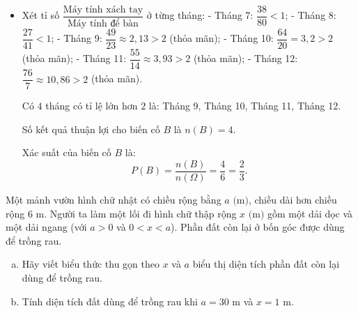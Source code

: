 \begin{bt}
{\begin{enumerate}[a)]
\begin{itemize}
				Số kết quả thuận lợi cho biến cố $A$ là $n(A) = 4$.
				
				Xác suất của biến cố $A$ là:
				$$P(A) = \dfrac{n(A)}{n(\Omega)} = \dfrac{4}{6} = \dfrac{2}{3}.$$
				\item Xét tỉ số $\dfrac{\text{Máy tính xách tay}}{\text{Máy tính để bàn}}$ ở từng tháng:
				- Tháng 7: $\dfrac{38}{80} < 1$;
				- Tháng 8: $\dfrac{27}{41} < 1$;
				- Tháng 9: $\dfrac{49}{23} \approx 2{,}13 > 2$ (thỏa mãn);
				- Tháng 10: $\dfrac{64}{20} = 3{,}2 > 2$ (thỏa mãn);
				- Tháng 11: $\dfrac{55}{14} \approx 3{,}93 > 2$ (thỏa mãn);
				- Tháng 12: $\dfrac{76}{7} \approx 10{,}86 > 2$ (thỏa mãn).
				
				Có $4$ tháng có tỉ lệ lớn hơn $2$ là: Tháng 9, Tháng 10, Tháng 11, Tháng 12.
				
				Số kết quả thuận lợi cho biến cố $B$ là $n(B) = 4$.
				
				Xác suất của biến cố $B$ là:
				$$P(B) = \dfrac{n(B)}{n(\Omega)} = \dfrac{4}{6} = \dfrac{2}{3}.$$
			\end{itemize}
		\end{enumerate}
	}
\end{bt}

\begin{bt}%
	Một mảnh vườn hình chữ nhật có chiều rộng bằng $a\text{ (m)}$, chiều dài hơn chiều rộng $6\text{ m}$. Người ta làm một lối đi hình chữ thập rộng $x\text{ (m)}$ gồm một dải dọc và một dải ngang (với $a > 0$ và $0 < x < a$). Phần đất còn lại ở bốn góc được dùng để trồng rau.
	\begin{enumerate}[a)]
		\item Hãy viết biểu thức thu gọn theo $x$ và $a$ biểu thị diện tích phần đất còn lại dùng để trồng rau.
		\item Tính diện tích đất dùng để trồng rau khi $a = 30\text{ m}$ và $x = 1\text{ m}$.
	\end{enumerate}
\end{bt}


